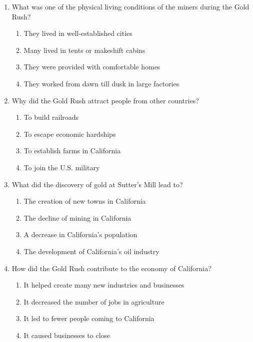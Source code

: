\documentclass[12pt]{article}
\begin{document}
\begin{enumerate}
    \vspace{0.5cm}

    \item What was one of the physical living conditions of the miners during the Gold Rush?
    \begin{enumerate}[label=\Alph*.]
        \item They lived in well-established cities
        \item Many lived in tents or makeshift cabins
        \item They were provided with comfortable homes
        \item They worked from dawn till dusk in large factories
    \end{enumerate}

    \vspace{0.5cm}

    \item Why did the Gold Rush attract people from other countries?
    \begin{enumerate}[label=\Alph*.]
        \item To build railroads
        \item To escape economic hardships
        \item To establish farms in California
        \item To join the U.S. military
    \end{enumerate}

    \vspace{0.5cm}

    \item What did the discovery of gold at Sutter’s Mill lead to?
    \begin{enumerate}[label=\Alph*.]
        \item The creation of new towns in California
        \item The decline of mining in California
        \item A decrease in California’s population
        \item The development of California’s oil industry
    \end{enumerate}

    \vspace{0.5cm}

    \item How did the Gold Rush contribute to the economy of California?
    \begin{enumerate}[label=\Alph*.]
        \item It helped create many new industries and businesses
        \item It decreased the number of jobs in agriculture
        \item It led to fewer people coming to California
        \item It caused businesses to close
    \end{enumerate}


\end{enumerate}
\end{document}
